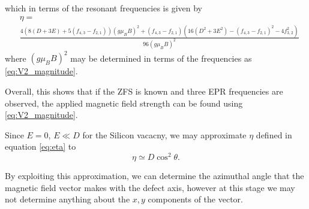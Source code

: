 which in terms of the resonant frequencies is given by
\begin{equation}
	\begin{align}
		 & \eta =                                                                                                                                                              \\
		 & \frac{4\left(8(D + 3E) + 5(f_{4,3}-f_{2,1})\right)(g\mu_B B)^2 + (f_{4,3} - f_{2,1})\left(16(D^2 + 3E^2) - (f_{4,3}-f_{2,1})^2 - 4f_{3,2}^2\right)}{96(g\mu_B B)^2}
	\end{align}
	\label{eq:eta_resonant}
\end{equation}
where $(g \mu_B B)^2$ may be determined in terms of the frequencies as \eqref{eq:V2_magnitude}.


Overall, this shows that if the ZFS is known and three EPR frequencies are observed, the applied magnetic field strength can be found using \eqref{eq:V2_magnitude}.






%


Since $E = 0$, $E \ll D$ for the Silicon vacacny, we may approximate $\eta$ defined in equation \eqref{eq:eta} to
\begin{equation}
	\eta \simeq D \cos^2 \theta.
	\label{eq:}
\end{equation}

By exploiting this approximation, we can determine the azimuthal angle that the magnetic field vector makes with the defect axis, however at this stage we may not determine anything about the $x,y$ components of the vector.

